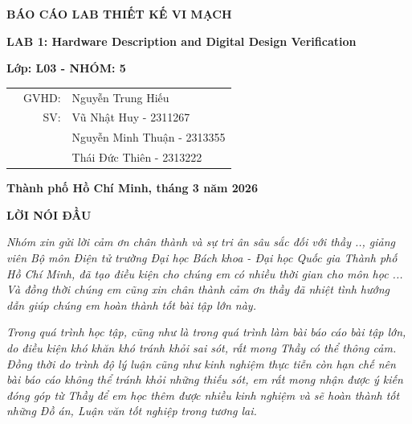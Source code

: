 \documentclass[12pt, a4paper, oneside]{article}
\begin{document}
\begin{titlepage}
\begin{center}
    \fontsize{18pt}{17pt}\selectfont 
    \textbf{BÁO CÁO LAB THIẾT KẾ VI MẠCH}
\end{center}
\begin{center}
    \fontsize{15pt}{17pt}\selectfont 
    \textbf{\textrm{LAB 1: Hardware Description and Digital Design Verification}}
\end{center}

\begin{center}
    \vspace{15pt}
\textbf{Lớp: L03 - NHÓM: 5}
\end{center}

\vspace{10pt}

\begin{table}[h]
\begin{tabular}{rrl}
\hspace{5 cm} & GVHD: &Nguyễn Trung Hiếu\\
& SV: & Vũ Nhật Huy - 2311267\\
& & Nguyễn Minh Thuận - 2313355 \\
& & Thái Đức Thiên - 2313222\\
\end{tabular}
\end{table}
\vfill
\centerline{\bf Thành phố Hồ Chí Minh, tháng 3 năm 2026}

\vspace{1cm}
\end{titlepage}
\newpage
\thispagestyle{empty}
\onehalfspacing
\begin{center}
    \textbf{LỜI NÓI ĐẦU}
\end{center}

\textit{Nhóm xin gửi lời cảm ơn chân thành và sự tri ân sâu sắc đối với thầy .., giảng viên Bộ môn Điện tử trường Đại học Bách khoa - Đại học Quốc gia Thành phố Hồ Chí Minh, đã tạo điều kiện cho chúng em có nhiều thời gian cho môn học ... Và đồng thời chúng em cũng xin chân thành cảm ơn thầy đã nhiệt tình hướng dẫn giúp chúng em hoàn thành tốt bài tập lớn này.}

\textit{Trong quá trình học tập, cũng như là trong quá trình làm bài báo cáo bài tập lớn, do điều kiện khó khăn khó tránh khỏi sai sót, rất mong Thầy có thể thông cảm. Đồng thời do trình độ lý luận cũng như kinh nghiệm thực tiễn còn hạn chế nên bài báo cáo không thể tránh khỏi những thiếu sót, em rất mong nhận được ý kiến đóng góp từ Thầy để em học thêm được nhiều kinh nghiệm và sẽ hoàn thành tốt những Đồ án, Luận văn tốt nghiệp trong tương lai.}
\end{document}
